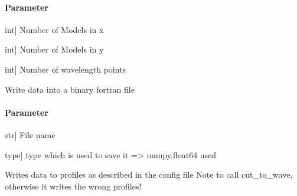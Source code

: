 \documentclass[letterpaper,10pt,english]{sphinxmanual}
\begin{document}
\begin{fulllineitems}
\begin{fulllineitems}
\paragraph{Parameter}
\label{\detokenize{classes:id41}}\begin{description}
\sphinxlineitem{nx}{[}int{]}
\sphinxAtStartPar
Number of Models in x

\sphinxlineitem{ny}{[}int{]}
\sphinxAtStartPar
Number of Models in y

\sphinxlineitem{nw}{[}int{]}
\sphinxAtStartPar
Number of wavelength points

\end{description}

\end{fulllineitems}


\begin{fulllineitems}
\label{\detokenize{classes:profile_stk.Profile.write}}
\pysigstartsignatures
{}
\pysigstopsignatures
\sphinxAtStartPar
Write data into a binary fortran file


\paragraph{Parameter}
\label{\detokenize{classes:id42}}\begin{description}
\sphinxlineitem{fname}{[}str{]}
\sphinxAtStartPar
File name

\sphinxlineitem{fmt\_type}{[}type{]}
\sphinxAtStartPar
type which is used to save it =\textgreater{} numpy.float64 used

\end{description}

\end{fulllineitems}


\begin{fulllineitems}
\label{\detokenize{classes:profile_stk.Profile.write_profile}}
\pysigstartsignatures
{}
\pysigstopsignatures
\sphinxAtStartPar
Writes data to profiles as described in the config file
Note to call cut\_to\_wave, otherwise it writes the wrong profiles!



\end{fulllineitems}
\end{fulllineitems}
\end{document}
